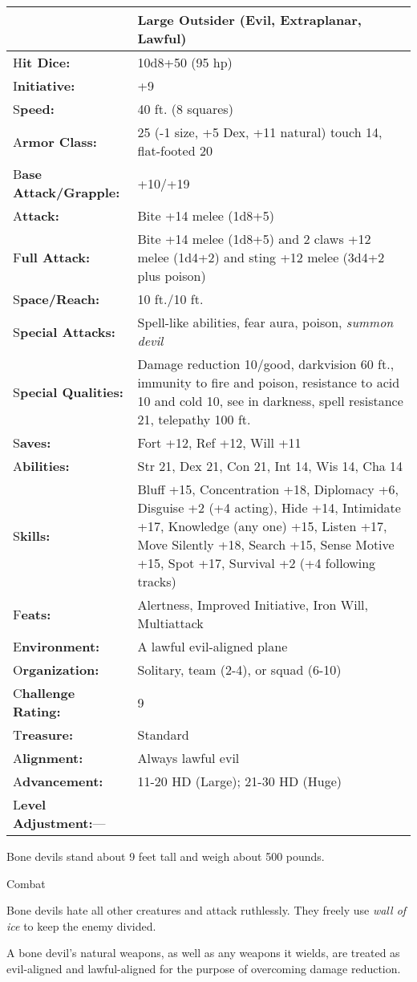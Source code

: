 \documentclass{article}
\begin{document}
\begin{tabular}{|>{\raggedright}p{91pt}|>{\raggedright}p{231pt}|}
\hline
  & Large Outsider (Evil, Extraplanar, Lawful)\tabularnewline
\hline
H\textbf{it Dice:} & 10d8+50 (95 hp)\tabularnewline
\hline
I\textbf{nitiative:} & +9\tabularnewline
\hline
S\textbf{peed:} & 40 ft. (8 squares)\tabularnewline
\hline
A\textbf{rmor Class:} & 25 (-1 size, +5 Dex, +11 natural) touch 14, flat-footed 
20\tabularnewline
\hline
B\textbf{ase Attack/Grapple:} & +10/+19\tabularnewline
\hline
A\textbf{ttack:} & Bite +14 melee (1d8+5)\tabularnewline
\hline
F\textbf{ull Attack:} & Bite +14 melee (1d8+5) and 2 claws +12 melee (1d4+2) and 
sting +12 melee (3d4+2 plus poison)\tabularnewline
\hline
S\textbf{pace/Reach:} & 10 ft./10 ft.\tabularnewline
\hline
S\textbf{pecial Attacks:} & Spell-like abilities, fear aura, poison, \textit{summon 
devil}\tabularnewline
\hline
S\textbf{pecial Qualities:} & Damage reduction 10/good, darkvision 60 ft., immunity 
to fire and poison, resistance to acid 10 and cold 10, see in darkness, spell resistance 
21, telepathy 100 ft.\tabularnewline
\hline
S\textbf{aves:} & Fort +12, Ref +12, Will +11\tabularnewline
\hline
A\textbf{bilities:} & Str 21, Dex 21, Con 21, Int 14, Wis 14, Cha 14\tabularnewline
\hline
S\textbf{kills:} & Bluff +15, Concentration +18, Diplomacy +6, Disguise +2 (+4 
acting), Hide +14, Intimidate +17, Knowledge (any one) +15, Listen +17, Move Silently 
+18, Search +15, Sense Motive +15, Spot +17, Survival +2 (+4 following tracks)\tabularnewline
\hline
F\textbf{eats:} & Alertness, Improved Initiative, Iron Will, Multiattack\tabularnewline
\hline
E\textbf{nvironment:} & A lawful evil-aligned plane\tabularnewline
\hline
O\textbf{rganization:} & Solitary, team (2-4), or squad (6-10)\tabularnewline
\hline
C\textbf{hallenge Rating:} & 9\tabularnewline
\hline
T\textbf{reasure:} & Standard\tabularnewline
\hline
A\textbf{lignment:} & Always lawful evil\tabularnewline
\hline
A\textbf{dvancement:} & 11-20 HD (Large); 21-30 HD (Huge)\tabularnewline
\hline
L\textbf{evel Adjustment:}--- & \tabularnewline
\hline
\end{tabular}

Bone devils stand about 9 feet tall and weigh about 500 pounds.

Combat

Bone devils hate all other creatures and attack ruthlessly. They freely use \textit{wall 
of ice }to keep the enemy divided.

A bone devil's natural weapons, as well as any weapons it wields, are treated as 
evil-aligned and lawful-aligned for the purpose of overcoming damage reduction.
\end{document}
